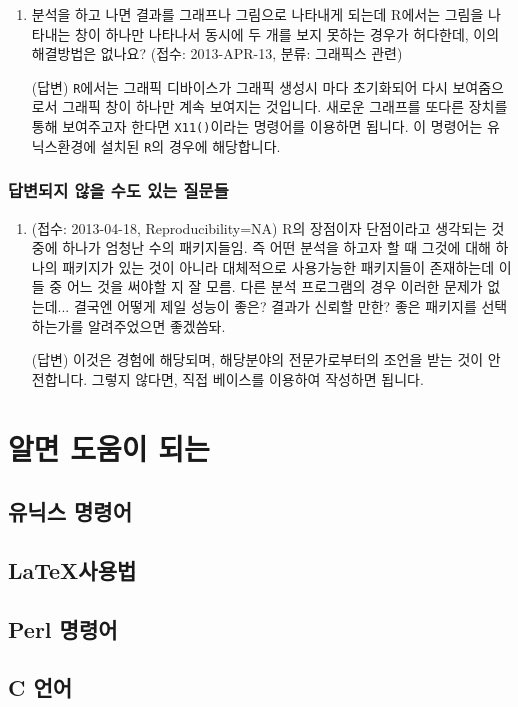 \documentclass{book}
\begin{document}
\begin{enumerate}
	\item 분석을 하고 나면 결과를 그래프나 그림으로 나타내게 되는데 R에서는 그림을 나타내는 창이 하나만 나타나서 동시에 두 개를 보지 못하는 경우가 허다한데, 이의 해결방법은 없나요? (접수: 2013-APR-13, 분류: 그래픽스 관련) 
	
	\textsf{(답변)} \texttt{R}에서는 그래픽 디바이스가 그래픽 생성시 마다 초기화되어 다시 보여줌으로서 그래픽 창이 하나만 계속 보여지는 것입니다.  새로운 그래프를 또다른 장치를 통해 보여주고자 한다면 \texttt{X11()}이라는 명령어를 이용하면 됩니다.  
	이 명령어는 유닉스환경에 설치된 \texttt{R}의 경우에 해당합니다.  
	


\end{enumerate}


\section{답변되지 않을 수도 있는 질문들}

\begin{enumerate}
	\item (접수: 2013-04-18, Reproducibility=NA) R의 장점이자 단점이라고 생각되는 것 중에 하나가 엄청난 수의 패키지들임. 즉 어떤 분석을 하고자 할 때 그것에 대해 하나의 패키지가 있는 것이 아니라 대체적으로 사용가능한 패키지들이 존재하는데 이들 중 어느 것을 써야할 지 잘 모름. 다른 분석 프로그램의 경우 이러한 문제가 없는데... 결국엔 어떻게 제일 성능이 좋은? 결과가 신뢰할 만한? 좋은 패키지를 선택하는가를 알려주었으면 좋겠씀돠.
	
	\textsf{(답변)} 이것은 경험에 해당되며, 해당분야의 전문가로부터의 조언을 받는 것이 안전합니다.  그렇지 않다면, 직접 베이스를 이용하여 작성하면 됩니다. 
	
\end{enumerate}




\part{알면 도움이 되는}
\chapter{유닉스 명령어}

\chapter{\LaTeX 사용법}

\chapter{Perl 명령어}

\chapter{C 언어} 


\nocite{GNUR}
\nocite{GNUR-FAQ}



\end{document}
